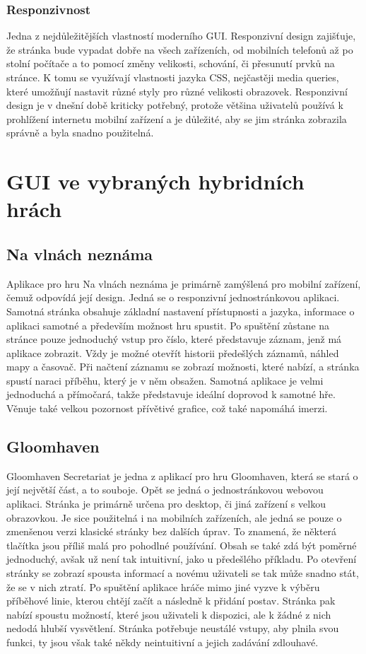 \subsubsection{Responzivnost}
Jedna z nejdůležitějších vlastností moderního GUI. Responzivní design zajišťuje, že stránka bude vypadat dobře na všech zařízeních, od mobilních telefonů až po stolní počítače a to pomocí změny velikosti, schování, či přesunutí prvků na stránce. K tomu se využívají vlastnosti jazyka CSS, nejčastěji media queries, které umožňují nastavit různé styly pro různé velikosti obrazovek. Responzivní design je v dnešní době kriticky potřebný, protože většina uživatelů používá k prohlížení internetu mobilní zařízení a je důležité, aby se jim stránka zobrazila správně a byla snadno použitelná.\cite{responsive_design}

\section{GUI ve vybraných hybridních hrách}

\subsection{Na vlnách neznáma}
Aplikace pro hru Na vlnách neznáma je primárně zamýšlená pro mobilní zařízení, čemuž odpovídá její design. Jedná se o responzivní jednostránkovou aplikaci. Samotná stránka obsahuje základní nastavení přístupnosti a jazyka, informace o aplikaci samotné a především možnost hru spustit. Po spuštění zůstane na stránce pouze jednoduchý vstup pro číslo, které představuje záznam, jenž má aplikace zobrazit. Vždy je možné otevřít historii předešlých záznamů, náhled mapy a časovač. Při načtení záznamu se zobrazí možnosti, které nabízí, a stránka spustí naraci příběhu, který je v něm obsažen. Samotná aplikace je velmi jednoduchá a přímočará, takže představuje ideální doprovod k samotné hře. Věnuje také velkou pozornost přívětivé grafice, což také napomáhá imerzi.


\subsection{Gloomhaven}
Gloomhaven Secretariat je jedna z aplikací pro hru Gloomhaven, která se stará o její největší část, a to souboje. Opět se jedná o jednostránkovou webovou aplikaci. Stránka je primárně určena pro desktop, či jiná zařízení s velkou obrazovkou. Je sice použitelná i na mobilních zařízeních, ale jedná se pouze o zmenšenou verzi klasické stránky bez dalších úprav. To znamená, že některá tlačítka jsou příliš malá pro pohodlné používání. Obsah se také zdá být poměrné jednoduchý, avšak už není tak intuitivní, jako u předešlého příkladu. Po otevření stránky se zobrazí spousta informací a novému uživateli se tak může snadno stát, že se v nich ztratí. Po spuštění aplikace hráče mimo jiné vyzve k výběru příběhové linie, kterou chtějí začít a následně k přidání postav. Stránka pak nabízí spoustu možností, které jsou uživateli k dispozici, ale k žádné z nich nedodá hlubší vysvětlení. Stránka potřebuje neustálé vstupy, aby plnila svou funkci, ty jsou však také někdy neintuitivní a jejich zadávání zdlouhavé.

